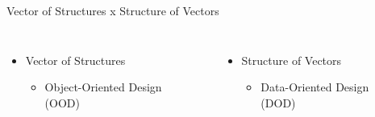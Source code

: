 \begin{frame}{Vector of Structures x Structure of Vectors}
    \begin{columns}
            \begin{itemize}
                \item Vector of Structures
                \begin{itemize}
                    \item Object-Oriented Design (OOD)
                \end{itemize}
            \end{itemize}
            \begin{center}
            \end{center}
            \begin{itemize}
                \item Structure of Vectors
                \begin{itemize}
                    \item Data-Oriented Design (DOD)
                \end{itemize}
            \end{itemize}
            \begin{center}
            \end{center}
    \end{columns}
\end{frame}

